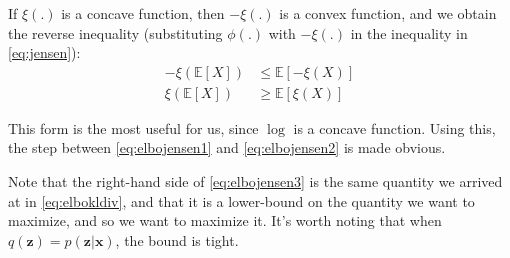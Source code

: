 If $\xi(.)$ is a concave function, then $- \xi(.)$ is a convex function, and we
obtain the reverse inequality (substituting $\phi(.)$ with $-\xi(.)$ in the
inequality in \ref{eq:jensen}):
\begin{align}
    -\xi(\mathbb{E}[X]) &\leq \mathbb{E}[-\xi(X)] \\
    \xi(\mathbb{E}[X]) &\geq \mathbb{E}[\xi(X)]
\end{align}

This form is the most useful for us, since $\log$ is a concave function. Using
this, the step between \ref{eq:elbojensen1} and \ref{eq:elbojensen2} is made
obvious.

Note that the right-hand side of \ref{eq:elbojensen3} is the same quantity
we arrived at in \ref{eq:elbokldiv}, and that it is a lower-bound on the
quantity we want to maximize, and so we want to maximize it. It's worth noting
that when $q(\bm{z}) = p(\bm{z}|\bm{x})$, the bound is tight.
